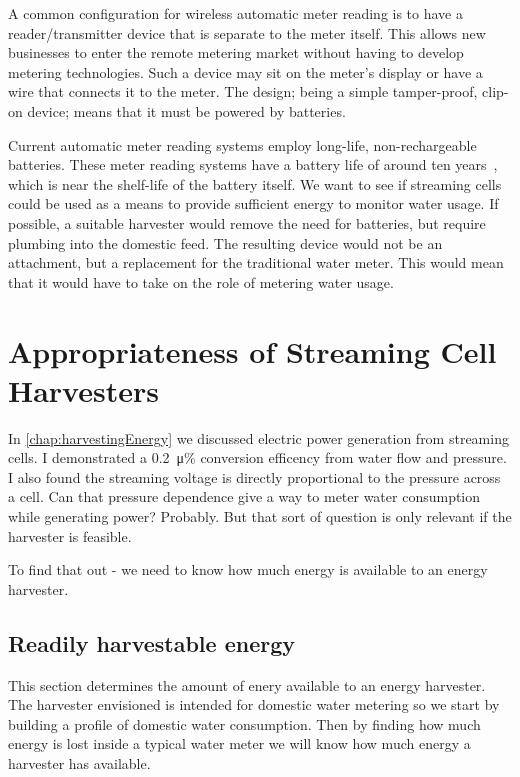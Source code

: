   A common configuration for wireless automatic meter reading is to have a reader/transmitter device that is separate to the meter itself.
  This allows new businesses to enter the remote metering market without having to develop metering technologies.
  Such a device may sit on the meter's display or have a wire that connects it to the meter.
  The design; being a simple tamper-proof, clip-on device; means that it must be powered by batteries.

  Current automatic meter reading systems employ long-life, non-rechargeable batteries.
  These meter reading systems have a battery life of around ten years~\cite{BMeters2014}, which is near the shelf-life of the battery itself.
  We want to see if streaming cells could be used as a means to provide sufficient energy to monitor water usage.
  If possible, a suitable harvester would remove the need for batteries, but require plumbing into the domestic feed.
  The resulting device would not be an attachment, but a replacement for the traditional water meter.
  This would mean that it would have to take on the role of metering water usage.


\section{Appropriateness of Streaming Cell Harvesters}

  In \cref{chap:harvestingEnergy} we discussed electric power generation from streaming cells.
  I demonstrated a \SI{0.2}{\micro\percent} conversion efficency from water flow and pressure.
  I also found the streaming voltage is directly proportional to the pressure across a cell.
  Can that pressure dependence give a way to meter water consumption while generating power? Probably.
  But that sort of question is only relevant if the harvester is feasible.

  To find that out - we need to know how much energy is available to an energy harvester.


  \subsection{Readily harvestable energy}
    This section determines the amount of enery available to an energy harvester.
    The harvester envisioned is intended for domestic water metering so we start by building a profile of domestic water consumption.
    Then by finding how much energy is lost inside a typical water meter we will know how much energy a harvester has available.

